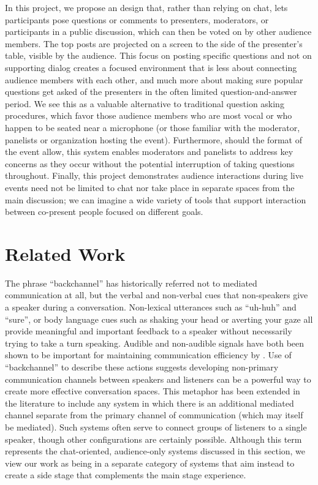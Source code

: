In this project, we propose an design that, rather than relying on chat, lets participants pose questions or comments to presenters, moderators, or participants in a public discussion, which can then be voted on by other audience members. The top posts are projected on a screen to the side of the presenter's table, visible by the audience. This focus on posting specific questions and not on supporting dialog creates a focused environment that is less about connecting audience members with each other, and much more about making sure popular questions get asked of the presenters in the often limited question-and-answer period. We see this as a valuable alternative to traditional question asking procedures, which favor those audience members who are most vocal or who happen to be seated near a microphone (or those familiar with the moderator, panelists or organization hosting the event). Furthermore, should the format of the event allow, this system enables moderators and panelists to address key concerns as they occur without the potential interruption of taking questions throughout. Finally, this project demonstrates audience interactions during live events need not be limited to chat nor take place in separate spaces from the main discussion; we can imagine a wide variety of tools that support interaction between co-present people focused on different goals.

\section{Related Work}

The phrase ``backchannel'' has historically referred not to mediated communication at all, but the verbal and non-verbal cues that non-speakers give a speaker during a conversation. Non-lexical utterances such as ``uh-huh'' and ``sure'', or body language cues such as shaking your head or averting your gaze all provide meaningful and important feedback to a speaker without necessarily trying to take a turn speaking. Audible and non-audible signals have both been shown to be important for maintaining communication efficiency by \citet{Krauss:1977bu}. Use of ``backchannel'' to describe these actions suggests developing non-primary communication channels between speakers and listeners can be a powerful way to create more effective conversation spaces. This metaphor has been extended in the literature to include any system in which there is an additional mediated channel separate from the primary channel of communication (which may itself be mediated). Such systems often serve to connect groups of listeners to a single speaker, though other configurations are certainly possible. Although this term represents the chat-oriented, audience-only systems discussed in this section, we view our work as being in a separate category of systems that aim instead to create a side stage that complements the main stage experience. 

